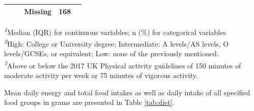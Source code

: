 \documentclass[nutrients,article,submit,moreauthors,pdftex]{Definitions/mdpi}
\begin{document}
\begin{table}[t]
\begin{tabular*}{1\linewidth}{@{\extracolsep{\fill}}lcc}
    Missing & 168 &  \\ 
\bottomrule
\end{tabular*}
\begin{minipage}{\linewidth}
\textsuperscript{\textit{1}}Median (IQR) for continuous variables; n (\%) for categorical variables\\
\textsuperscript{\textit{2}}High: College or University degree;
Intermediate: A levels/AS levels, O levels/GCSEs, or equivalent;
Low: none of the previously mentioned.\\
\textsuperscript{\textit{3}}Above or below the 2017 UK Physical activity guidelines of 150 minutes of moderate activity per week or 75 minutes of vigorous activity.\\
\end{minipage}
\end{table}

\noindent Mean daily energy and total food intakes as well as daily
intake of all specified food groups in grams are presented in Table
\ref{tab:diet}.
\end{document}
